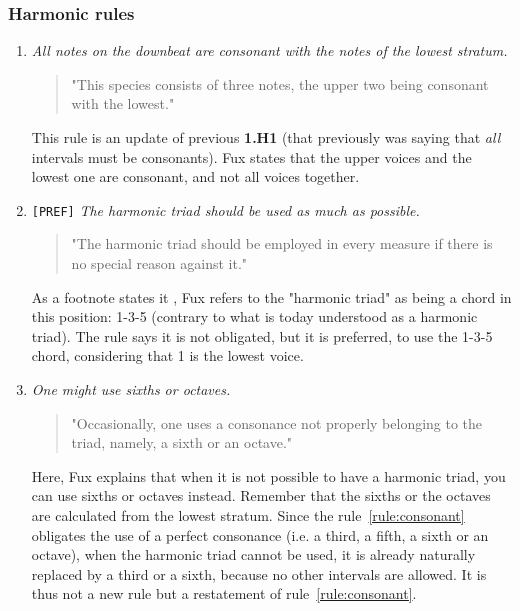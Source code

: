 \subsubsection{Harmonic rules}
\begin{enumerate}[wide, label=\bfseries 1.H\arabic*]
    \item\label{rule:consonant} \greendots \textit{All notes on the downbeat are consonant with the notes of the lowest stratum.}
     
    \begin{quotation}
       "This species consists of three notes, the upper two being consonant with the lowest."
       \textcite[p.71]{GaPEng}
   \end{quotation}

   This rule is an update of previous \textbf{1.H1} (that previously was saying that \textit{all} intervals must be consonants). Fux states that the upper voices and the lowest one are consonant, and not all voices together. 
    
    \setcounter{enumi}{7} %

    \item\label{rule:harmonic-triad} \texttt{[PREF]}  \textit{The harmonic triad should be used as much as possible.} 

    \begin{quotation}
    "The harmonic triad should be employed in every measure if there is no special reason against it."
    \textcite[p.71]{GaPEng}
    \end{quotation}

    As a footnote states it \cite[footnote, p.71]{GaPEng}, Fux refers to the "harmonic triad" as being a chord in this position: 1-3-5 (contrary to what is today understood as a harmonic triad).
    The rule says it is not obligated, but it is preferred, to use the 1-3-5 chord, considering that 1 is the lowest voice.
    

    \item\label{rule:sixth-or-octaves}  \textit{One might use sixths or octaves.}

    \begin{quotation}
    "Occasionally, one uses a consonance not properly belonging to the triad, namely, a sixth or an octave."
    \textcite[p.72]{GaPEng}
    \end{quotation}

    Here, Fux explains that when it is not possible to have a harmonic triad, you can use sixths or octaves instead. Remember that the sixths or the octaves are calculated from the lowest stratum. Since the rule~\ref{rule:consonant} obligates the use of a perfect consonance (i.e. a third, a fifth, a sixth or an octave), when the harmonic triad cannot be used, it is already naturally replaced by a third or a sixth, because no other intervals are allowed. It is thus not a new rule but a restatement of rule~\ref{rule:consonant}.    


\end{enumerate}
